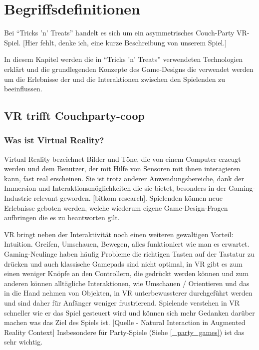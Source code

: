 \chapter{Begriffsdefinitionen}

Bei "`Tricks 'n' Treats"' handelt es sich um ein asymmetrisches Couch-Party VR-Spiel. [Hier fehlt, denke ich, eine kurze Beschreibung von unserem Spiel.]

In diesem Kapitel werden die in "`Tricks 'n' Treats"' verwendeten Technologien erklärt und die grundlegenden Konzepte des Game-Designs die verwendet werden um die  Erlebnisse der und die Interaktionen zwischen den Spielenden zu beeinflussen.

\section{VR trifft Couchparty-coop}

\subsection{Was ist Virtual Reality?}

Virtual Reality bezeichnet Bilder und Töne, die von einem Computer erzeugt werden und dem Benutzer, der mit Hilfe von Sensoren mit ihnen interagieren kann, fast real erscheinen.\cite{_oxford_dict} Sie ist trotz anderer Anwendungsbereiche, dank der Immersion und Interaktionsmöglichkeiten die sie bietet, besonders in der Gaming-Industrie relevant geworden. [bitkom research]. Spielenden können neue Erlebnisse geboten werden, welche wiederum eigene  Game-Design-Fragen aufbringen die es zu beantworten gilt.

VR bringt neben der Interaktivität noch einen weiteren gewaltigen Vorteil: Intuition. Greifen, Umschauen, Bewegen, alles funktioniert wie man es erwartet. Gaming-Neulinge haben häufig Probleme die richtigen Tasten auf der Tastatur zu drücken und auch klassische Gamepads sind nicht optimal, in VR gibt es zum einen weniger Knöpfe an den Controllern, die gedrückt werden können und zum anderen können alltägliche Interaktionen, wie Umschauen / Orientieren und das in die Hand nehmen von Objekten, in VR unterbewussterer durchgeführt werden und sind daher für Anfänger weniger frustrierend. Spielende verstehen in VR schneller wie er das Spiel gesteuert wird und können sich mehr Gedanken darüber machen was das Ziel des Spiels ist. [Quelle - Natural Interaction in Augmented Reality Context] Insbesondere für Party-Spiele (Siehe \ref{_party_games}) ist das sehr wichtig.

